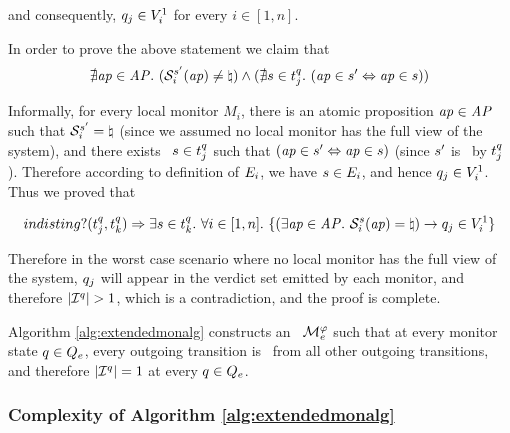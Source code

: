 and consequently, $q_j \in V_i^1$ for every $i \in [1, n]$.




In order to prove the above statement we claim that
$$ \nexists \mathit{ap} \in \mathit{AP}.~  (  \mathcal{S}_i^{s'} (\mathit{ap}) \neq \natural )  \wedge (\nexists s \in t_j^q.~ (\mathit{ap} \in s' \Leftrightarrow \mathit{ap} \in s) ) $$ 


Informally, for every local monitor $M_i$, there is an atomic proposition $\mathit{ap} \in \mathit{AP}$ such that $\mathcal{S}_i^{s'} = \natural$ (since we assumed no local monitor has the full view of the system), and there exists \event~$s \in t_j^q$ such that $(\mathit{ap} \in s' \Leftrightarrow \mathit{ap} \in s)$ (since $s'$ is \covered~by $t_j^q$). Therefore according to definition of $E_i$, we have $s \in E_i$, and hence $q_j \in V_i^1$. Thus we proved that 


$$ indisting?(t_j^q, t_k^q) \Rightarrow \exists s \in t_k^q. ~  \forall i \in [1, n].~ \{ (\exists \mathit{ap} \in \mathit{AP}.~ \mathcal{S}_i^s(\mathit{ap}) = \natural ) \rightarrow  q_j \in V_i^1\}$$
 
Therefore in the worst case scenario where no local monitor has the full view of the system, $q_j$ will appear in the verdict set emitted by each monitor, and therefore $|\mathcal{I}^q| > 1$, which is a contradiction, and the proof is complete.


Algorithm \ref{alg:extendedmonalg} constructs an \Exltl~$\mathcal{M}_e^\varphi$ such that at every monitor state $q \in Q_e$, every outgoing transition is \dist~from all other outgoing transitions, and therefore $|\mathcal{I}^q| = 1$ at every $q \in Q_e$. 


\iffalse

\subsubsection{Complexity of Algorithm \ref{alg:extendedmonalg}}


